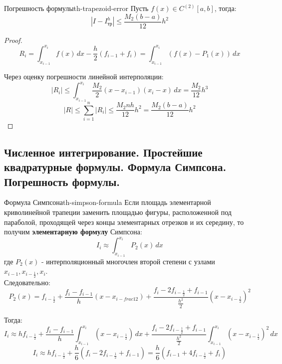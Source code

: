 \documentclass[14pt]{extarticle}
\begin{document}
    \begin{theorem}{Погрешность формулы}{th-trapezoid-error}
        Пусть $f(x) \in C^{(2)}[a, b]$, тогда:
        $$|I - I_{\text{тр}}^{h}| \leq \frac{M_{2}(b - a)}{12}h^{2}$$

        \begin{proof}
            $$R_{i} = \int_{x_{i - 1}}^{x_{i}} f(x) \, dx - \frac{h}{2}(f_{i - 1} + f_{i}) = \int_{x_{i - 1}}^{x_{i}}(f(x) - P_{1}(x)) \, dx$$

            Через оценку погрешности линейной интерполяции:
            $$|R_{i}| \leq \int_{x_{i - 1}}^{x_{i}} \frac{M_{2}}{2} (x - x_{i - 1})(x_{i} - x) \, dx = \frac{M_{2}}{12} h^{3}$$
            $$|R| \leq \sum_{i = 1}^{n} |R_{i}| \leq \frac{M_{2}nh}{12}h^{2} = \frac{M_{2}(b - a)}{12}h^{2}$$
        \end{proof}
    \end{theorem}

\clearpage
\subsection{Численное интегрирование. Простейшие квадратурные формулы. Формула Симпсона. Погрешность формулы.}

    \begin{theorem}{Формула Симпсона}{th-simpson-formula}
        Если площадь элементарной криволинейной трапеции заменить площадью фигуры, расположенной под параболой, проходящей через концы элементарных отрезков и их середину, то получим \textbf{элементарную формулу} Симпсона:
        $$I_{i} \approx \int_{x_{i-1}}^{x_{i}} P_{2}(x) \, dx$$
        где $P_{2}(x)$ - интерполяционный многочлен второй степени с узлами $x_{i - 1}, x_{i - \frac{1}{2}}, x_{i}$. \\
        Следовательно:
        $$P_{2}(x) = f_{i - \frac{1}{2}} + \frac{f_{i} - f_{i - 1}}{h}(x - x_{i - frac{1}{2}}) + \frac{f_{i} - 2f_{i - \frac{1}{2}} + f_{i-1}}{\frac{h^{2}}{2}}(x - x_{i - \frac{1}{2}})^{2}$$
        
        Тогда:
        $$I_{i} \approx hf_{i - \frac{1}{2}} + \frac{f_{i} - f_{i - 1}}{h}\int_{x_{i - 1}}^{x_{i}}(x - x_{i - \frac{1}{2}}) \, dx + \frac{f_{i} - 2f_{i - \frac{1}{2}} + f_{i - 1}}{\frac{h^{2}}{2}} \int_{x_{i - 1}}^{x_{i}} (x - x_{i - \frac{1}{2}})^{2} \, dx$$
        $$I_{i} \approx hf_{i - \frac{1}{2}} + \frac{h}{6}(f_{i} - 2f_{i - \frac{1}{2}} + f_{i - 1}) = \frac{h}{6}(f_{i - 1} + 4f_{i - \frac{1}{2}} + f_{i})$$
    \end{theorem}
\end{document}
